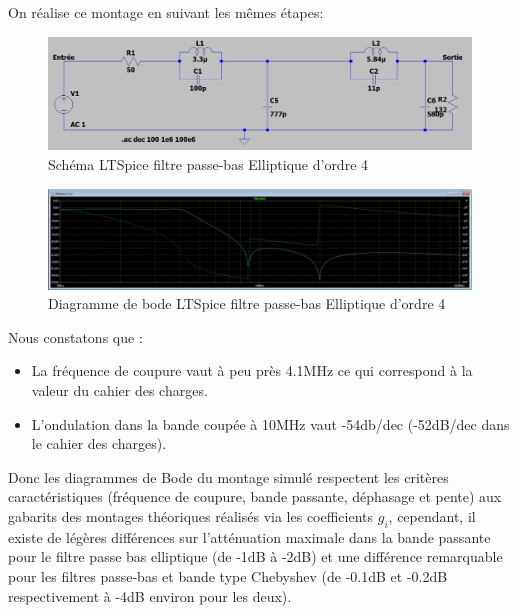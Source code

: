 On réalise ce montage en suivant les mêmes étapes: 

\begin{figure}[!htbp]
\includegraphics[width=\textwidth,height=\textheight,keepaspectratio]{src/circuits/passe bas elliptique.JPG}
\centering
    \caption{Schéma LTSpice filtre passe-bas Elliptique d'ordre 4}
\end{figure}
\FloatBarrier

\begin{figure}[!htbp]
\includegraphics[width=\textwidth,height=\textheight,keepaspectratio]{img_simule/elliptique_simule.JPG}
\centering
    \caption{Diagramme  de bode LTSpice filtre passe-bas Elliptique d'ordre 4}
\end{figure}
\FloatBarrier

Nous constatons que : 

\begin{itemize}
  \item La fréquence de coupure vaut à peu près 4.1MHz ce qui correspond à la valeur du cahier des charges. 
  \item L’ondulation dans la bande coupée à 10MHz vaut -54db/dec (-52dB/dec dans le cahier des charges). 
\end{itemize}


Donc les diagrammes de Bode du montage simulé respectent les critères caractéristiques (fréquence de coupure, bande passante, déphasage et pente) aux gabarits des montages théoriques réalisés via les coefficients $g_i$, cependant, il existe de légères différences sur l’atténuation maximale dans la bande passante pour le filtre passe bas elliptique (de -1dB à -2dB) et une différence remarquable pour les filtres passe-bas et bande type Chebyshev (de -0.1dB et -0.2dB respectivement à -4dB environ pour les deux).